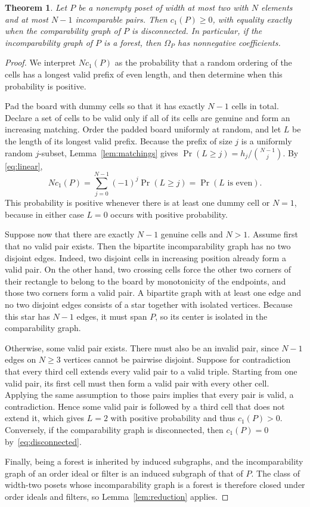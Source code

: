 \documentclass[11pt]{amsart}
\newtheorem{theorem}{Theorem}[section]
\theoremstyle{remark}
\numberwithin{equation}{section}
\newcommand{\lin}{c_1}
\begin{document}
\begin{theorem}\label{thm:sparse}
Let $P$ be a nonempty poset of width at most two with $N$ elements and at most
$N-1$ incomparable pairs. Then $\lin(P)\ge0$, with equality exactly when the
comparability graph of $P$ is disconnected. In particular, if the
incomparability graph of $P$ is a forest, then $\Omega_P$ has nonnegative
coefficients.
\end{theorem}

\begin{proof}
We interpret $N\lin(P)$ as the probability that a random ordering of the cells
has a longest valid prefix of even length, and then determine when this
probability is positive.

Pad the board with dummy cells so that it has exactly $N-1$ cells in total.
Declare a set of cells to be valid only if all of its cells are genuine and
form an increasing matching. Order the padded board uniformly at random, and
let $L$ be the length of its longest valid prefix. Because the prefix of size
$j$ is a uniformly random $j$-subset, Lemma~\ref{lem:matchings} gives
$\Pr(L\ge j)=h_j/\binom{N-1}{j}$. By \eqref{eq:linear},
\[
 N\lin(P)=\sum_{j=0}^{N-1}(-1)^j\Pr(L\ge j)=\Pr(L\text{ is even}).
\]
This probability is positive whenever there is at least one dummy cell or
$N=1$, because in either case $L=0$ occurs with positive probability.

Suppose now that there are exactly $N-1$ genuine cells and $N>1$. Assume first
that no valid pair exists. Then the bipartite incomparability graph has no two
disjoint edges. Indeed, two disjoint cells in increasing position already form
a valid pair. On the other hand, two crossing cells force the other two corners
of their rectangle to belong to the board by monotonicity of the endpoints, and
those two corners form a valid pair. A bipartite graph with at least one edge
and no two disjoint edges consists of a star together with isolated vertices.
Because this star has $N-1$ edges, it must span $P$, so its center is isolated
in the comparability graph.

Otherwise, some valid pair exists. There must also be an invalid pair, since
$N-1$ edges on $N\ge3$ vertices cannot be pairwise disjoint. Suppose for
contradiction that every third cell extends every valid pair to a valid triple.
Starting from one valid pair, its first cell must then form a valid pair with
every other cell. Applying the same assumption to those pairs implies that
every pair is valid, a contradiction. Hence some valid pair is followed by a
third cell that does not extend it, which gives $L=2$ with positive probability
and thus $\lin(P)>0$. Conversely, if the comparability graph is disconnected,
then $\lin(P)=0$ by~\eqref{eq:disconnected}.

Finally, being a forest is inherited by induced subgraphs, and the
incomparability graph of an order ideal or filter is an induced subgraph of
that of $P$. The class of width-two posets whose incomparability graph is a
forest is therefore closed under order ideals and filters, so
Lemma~\ref{lem:reduction} applies.
\end{proof}
\end{document}
